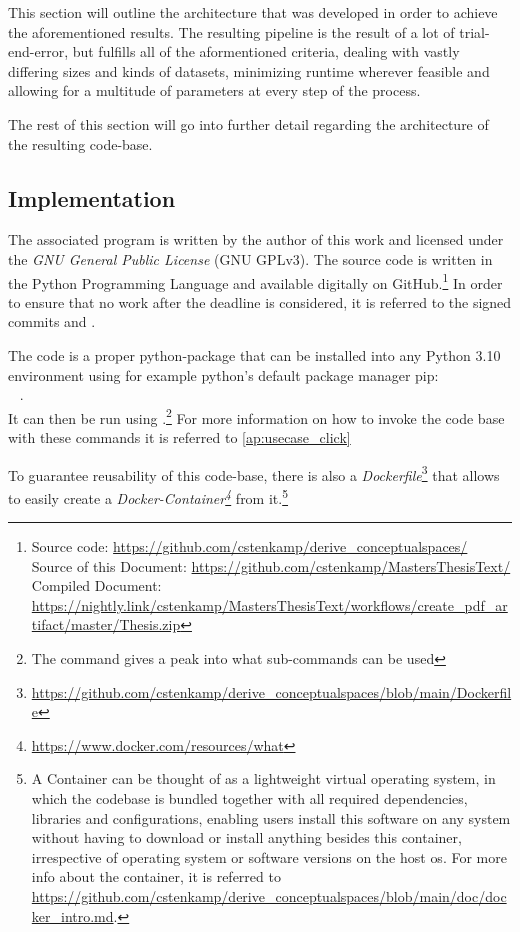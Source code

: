 This section will outline the architecture that was developed in order to achieve the aforementioned results. The resulting pipeline is the result of a lot of trial-end-error, but fulfills all of the aformentioned criteria, dealing with vastly differing sizes and kinds of datasets, minimizing runtime wherever feasible and allowing for a multitude of parameters at every step of the process. %

The rest of this section will go into further detail regarding the architecture of the resulting code-base. 

\subsection{Implementation}

The associated program is written by the author of this work and licensed under the \emph{GNU General Public License} (GNU GPLv3). The source code is written in the Python Programming Language and available digitally on GitHub.\footnote{Source code: \url{https://github.com/cstenkamp/derive_conceptualspaces/}\\Source of this Document: \url{https://github.com/cstenkamp/MastersThesisText/}\\Compiled Document: \url{https://nightly.link/cstenkamp/MastersThesisText/workflows/create_pdf_artifact/master/Thesis.zip}} In order to ensure that no work after the deadline is considered, it is referred to the signed commits  and . 

The code is a proper python-package that can be installed into any Python 3.10 environment using for example python's default package manager pip:\\ ~ .\\ It can then be run using .\footnote{The command  gives a peak into what sub-commands can be used} For more information on how to invoke the code base with these commands it is referred to \autoref{ap:usecase_click}

To guarantee reusability of this code-base, there is also a \emph{Dockerfile}\footnote{{\url{https://github.com/cstenkamp/derive_conceptualspaces/blob/main/Dockerfile}}} that allows to easily create a \emph{Docker-Container\footnote{\url{https://www.docker.com/resources/what}}} from it.\footnote{A Container can be thought of as a lightweight virtual operating system, in which the codebase is bundled together with all required dependencies, libraries and configurations, enabling users install this software on any system without having to download or install anything besides this container, irrespective of operating system or software versions on the host \acrshort{os}. For more info about the container, it is referred to \url{https://github.com/cstenkamp/derive_conceptualspaces/blob/main/doc/docker_intro.md}.}

